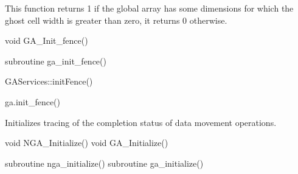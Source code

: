 \documentclass[12pt]{article}
\begin{document}
\gcoll

\begin{desc}

This function returns 1 if the global array has some dimensions for which the
ghost cell width is greater than zero, it returns 0 otherwise.

\end{desc}


\begin{capi}
\begin{ccode}
void GA_Init_fence()
\end{ccode}
\end{capi}

\begin{fapi}
\begin{fcode}
subroutine ga_init_fence()
\end{fcode}
\end{fapi}

\begin{cxxapi}
\begin{cxxcode}
GAServices::initFence()
\end{cxxcode}
\end{cxxapi}

\begin{pyapi}
\begin{pycode}
ga.init_fence()
\end{pycode}
\end{pyapi}

\local

\begin{desc}

Initializes tracing of the completion status of data movement operations.

\end{desc}


\begin{capi}
\begin{ccode}
void NGA_Initialize()
void GA_Initialize()
\end{ccode}
\end{capi}

\begin{fapi}
\begin{fcode}
subroutine nga_initialize()
subroutine ga_initialize()
\end{fcode}
\end{fapi}
\end{document}
